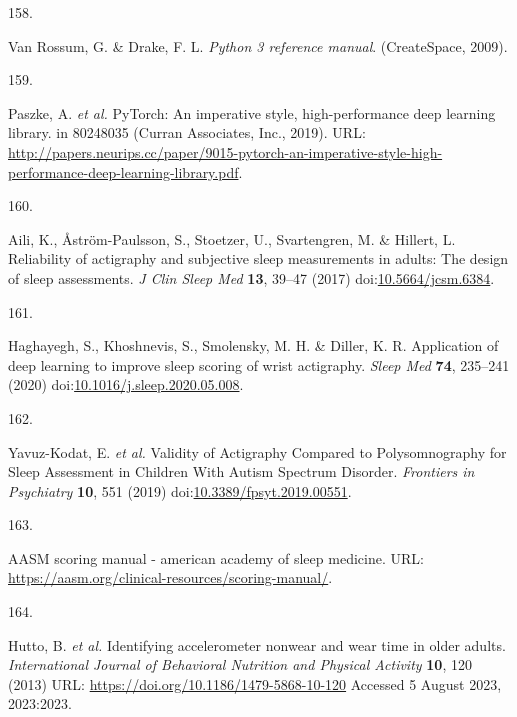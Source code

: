 \documentclass[
  10pt,
]{scrbook}
\newlength{\cslhangindent}
\newlength{\csllabelwidth}
\newlength{\cslentryspacingunit} %
\newenvironment{CSLReferences}[2] %
 {%
  \setlength{\parindent}{0pt}
  \ifodd #1
  \let\oldpar\par
  \def\par{\hangindent=\cslhangindent\oldpar}
  \fi
  \setlength{\parskip}{#2\cslentryspacingunit}
 }%
 {}
\newcommand{\CSLLeftMargin}[1]{\parbox[t]{\csllabelwidth}{#1}}
\newcommand{\CSLRightInline}[1]{\parbox[t]{\linewidth - \csllabelwidth}{#1}\break}
\let\originaltextbf\textbf
\renewcommand{\textbf}[1]{\textcolor{color1}{\originaltextbf{#1}}}
\begin{document}
\begin{CSLReferences}{0}{0}
\leavevmode{}%
\CSLLeftMargin{158. }%
\CSLRightInline{Van Rossum, G. \& Drake, F. L. \emph{Python 3 reference
manual}. (CreateSpace, 2009).}

\leavevmode{}%
\CSLLeftMargin{159. }%
\CSLRightInline{Paszke, A. \emph{et al.} PyTorch: An imperative style,
high-performance deep learning library. in 80248035 (Curran Associates,
Inc., 2019). URL:
\url{http://papers.neurips.cc/paper/9015-pytorch-an-imperative-style-high-performance-deep-learning-library.pdf}.}

\leavevmode{}%
\CSLLeftMargin{160. }%
\CSLRightInline{Aili, K., Åström-Paulsson, S., Stoetzer, U.,
Svartengren, M. \& Hillert, L. Reliability of actigraphy and subjective
sleep measurements in adults: The design of sleep assessments. \emph{J
Clin Sleep Med} \textbf{13}, 39--47 (2017)
doi:\href{https://doi.org/10.5664/jcsm.6384}{10.5664/jcsm.6384}.}

\leavevmode{}%
\CSLLeftMargin{161. }%
\CSLRightInline{Haghayegh, S., Khoshnevis, S., Smolensky, M. H. \&
Diller, K. R. Application of deep learning to improve sleep scoring of
wrist actigraphy. \emph{Sleep Med} \textbf{74}, 235--241 (2020)
doi:\href{https://doi.org/10.1016/j.sleep.2020.05.008}{10.1016/j.sleep.2020.05.008}.}

\leavevmode{}%
\CSLLeftMargin{162. }%
\CSLRightInline{Yavuz-Kodat, E. \emph{et al.} Validity of Actigraphy
Compared to Polysomnography for Sleep Assessment in Children With Autism
Spectrum Disorder. \emph{Frontiers in Psychiatry} \textbf{10}, 551
(2019)
doi:\href{https://doi.org/10.3389/fpsyt.2019.00551}{10.3389/fpsyt.2019.00551}.}

\leavevmode{}%
\CSLLeftMargin{163. }%
\CSLRightInline{AASM scoring manual - american academy of sleep
medicine. URL:
\url{https://aasm.org/clinical-resources/scoring-manual/}.}

\leavevmode{}%
\CSLLeftMargin{164. }%
\CSLRightInline{Hutto, B. \emph{et al.} Identifying accelerometer
nonwear and wear time in older adults. \emph{International Journal of
Behavioral Nutrition and Physical Activity} \textbf{10}, 120 (2013) URL:
\url{https://doi.org/10.1186/1479-5868-10-120} Accessed 5 August 2023,
2023:2023.}


\end{CSLReferences}
\end{document}
